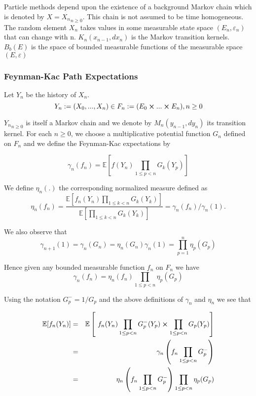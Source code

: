 Particle methods depend upon the existence of a background Markov chain which is denoted by $X = {X_n}_{n\geq 0}$. This chain is not assumed to be time homogeneous. The random element $X_n$ takes values in some measurable state space $(E_n, \varepsilon_n)$ that can change with n. $K_n(x_{n-1}, dx_n)$ is the Markov transition kernels. $B_b(E)$ is the space of bounded measurable functions of the measurable space $(E,\varepsilon)$

\subsubsection{Feynman-Kac Path Expectations}
Let $Y_n$ be the history of $X_n$.
$$Y_n := (X_0,...,X_n) \in F_n := (E_0 \cross ... \cross E_n), n \geq 0$$

${Y_n}_{n\geq 0}$ is itself a Markov chain and we denote by $M_n(y_{n-1},dy_n)$ its transition kernel. For each $n \geq 0$, we choose a multiplicative potential function $G_n$ defined on $F_n$ and we define the Feynman-Kac expectations by

\begin{equation}
\gamma_n(f_n) = \mathbb{E} \left[ f(Y_n) \prod_{1\leq p<n} G_k(Y_p)\right]
\end{equation}

We define $\eta_n(.)$ the corresponding normalized measure defined as
\begin{equation}
\eta_n(f_n) = \frac{\mathbb{E}\left[ f_n(Y_n)\prod_{1\leq k<n}G_k(Y_k) \right]}{\mathbb{E}\left[\prod_{1\leq k<n}G_k(Y_k) \right]} = \gamma_n(f_n)/\gamma_n(1).
\end{equation}

We also observe that
$$\gamma_{n+1}(1) = \gamma_n(G_n) = \eta_n(G_n)\gamma_n(1) = \prod_{p=1}^{n}\eta_p(G_p)$$ 

Hence given any bounded measurable function $f_n$ on $F_n$ we have
$$\gamma_n(f_n) = \eta_n(f_n) \prod_{1\leq p<n}\eta_p(G_p)$$

Using the notation $G_p^- = 1/G_p$ and the above definitions of $\gamma_n$ and $\eta_n$ we see that

\begin{eqnarray}
\mathbb{E}[f_n(Y_n)] & = & \mathbb{E}\left[\ f_n(Y_n) \prod_{1\leq p < n} G_p^-(Y_p) \cross \prod_{1\leq p < n} G_p(Y_p) \right]\\
& = & \gamma_n\left(  f_n \prod_{1\leq p < n} G_p^- \right)\\
& = & \eta_n\left(  f_n \prod_{1\leq p < n} G_p^- \right) \prod_{1\leq p < n} \eta_p(G_p)
\end{eqnarray}

